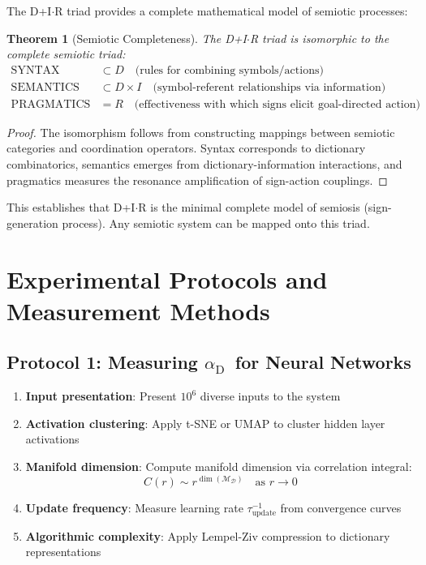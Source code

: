 \documentclass[12pt,a4paper]{article}
\newtheorem{theorem}{Theorem}
\DeclareMathOperator{\dimension}{dim}
\DeclareRobustCommand{\alD}{\texorpdfstring{\ensuremath{\alpha_{\mathrm{D}}}}{alpha_D}}
\newcommand{\Dict}{\mathcal{D}}
\newcommand{\Mdict}{\mathcal{M}_{\Dict}}
\begin{document}
	The D+I\(\cdot\)R triad provides a complete mathematical model of semiotic processes:
	
	\begin{theorem}[Semiotic Completeness]
		The D+I\(\cdot\)R triad is isomorphic to the complete semiotic triad:
		\begin{align*}
			\text{SYNTAX} &\subset D \quad \text{(rules for combining symbols/actions)} \\
			\text{SEMANTICS} &\subset D \times I \quad \text{(symbol-referent relationships via information)} \\
			\text{PRAGMATICS} &= R \quad \text{(effectiveness with which signs elicit goal-directed action)}
		\end{align*}
	\end{theorem}
	
	\begin{proof}
		The isomorphism follows from constructing mappings between semiotic categories and coordination operators. Syntax corresponds to dictionary combinatorics, semantics emerges from dictionary-information interactions, and pragmatics measures the resonance amplification of sign-action couplings.
	\end{proof}
	
	This establishes that D+I\(\cdot\)R is the minimal complete model of semiosis (sign-generation process). Any semiotic system can be mapped onto this triad.
	
	\section{Experimental Protocols and Measurement Methods}
	
	\subsection{Protocol 1: Measuring \alD\ for Neural Networks}
	\label{subsec:protocol-alpha}
	
	\begin{enumerate}
		\item \textbf{Input presentation}: Present \(10^6\) diverse inputs to the system
		\item \textbf{Activation clustering}: Apply t-SNE or UMAP to cluster hidden layer activations
		\item \textbf{Manifold dimension}: Compute manifold dimension via correlation integral:
		\[
		C(r) \sim r^{\dimension(\Mdict)} \quad \text{as } r \to 0
		\]
		\item \textbf{Update frequency}: Measure learning rate \(\tau_{\mathrm{update}}^{-1}\) from convergence curves
		\item \textbf{Algorithmic complexity}: Apply Lempel-Ziv compression to dictionary representations
	\end{enumerate}
	
\end{document}
